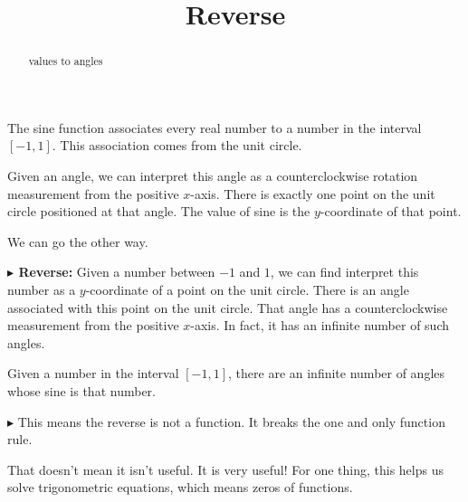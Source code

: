 \documentclass{ximera}
\title{Reverse}
\begin{document}
\begin{abstract}
values to angles
\end{abstract}
\maketitle










The sine function associates every real number to a number in the interval $[-1,1]$.  This association comes from the unit circle.


Given an angle, we can interpret this angle as a counterclockwise rotation measurement from the positive $x$-axis. There is exactly one point on the unit circle positioned at that angle. The value of sine is the $y$-coordinate of that point.

We can go the other way.



\textbf{\textcolor{blue!55!black}{$\blacktriangleright$ Reverse:}} Given a number between $-1$ and $1$, we can find interpret this number as a $y$-coordinate of a point on the unit circle.  There is an angle associated with this point on the unit circle.  That angle has a counterclockwise measurement from the positive $x$-axis.   In fact, it has an infinite number of such angles.


Given a number in the interval $[-1,1]$, there are an infinite number of angles whose sine is that number.





\textbf{\textcolor{blue!55!black}{$\blacktriangleright$}} This means the reverse is not a function.  It breaks the one and only function rule.


That doesn't mean it isn't useful.  It is very useful!  For one thing, this helps us solve trigonometric equations, which means zeros of functions.
\end{document}
